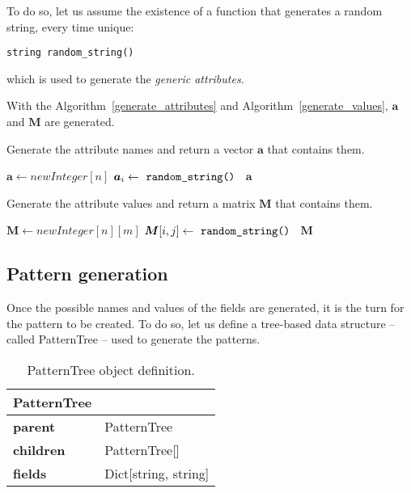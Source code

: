 \documentclass{acm_proc_article-sp-sigmod09}
\begin{document}
To do so, let us assume the existence of a function that generates a random string, every time unique:
\begin{verbatim}
string random_string()
\end{verbatim}
which is used to generate the \emph{generic attributes}.

With the Algorithm~\ref{generate_attributes} and Algorithm~\ref{generate_values}, $\boldsymbol{a}$ and $\boldsymbol{M}$ are generated.
\begin{algorithm}
\caption{Generate the attribute names and return a vector $\boldsymbol{a}$ that contains them.}
\label{generate_attributes}
\begin{algorithmic}[1]
\State $\boldsymbol{a} \gets new Integer[n]$
	\State $\boldsymbol{a}_i \gets \text{ \texttt{random\_string() }} $ 
\EndFor
\Return $\boldsymbol{a}$
\EndFunction
\end{algorithmic}
\end{algorithm}

\begin{algorithm}
\caption{Generate the attribute values and return a matrix $\boldsymbol{M}$ that contains them.}
\label{generate_values}
\begin{algorithmic}[1]
\State $\boldsymbol{M} \gets new Integer[n][m]$
		\State $\boldsymbol{M}[i, j] \gets \text{ \texttt{random\_string() }} $ 
	\EndFor
\EndFor
\Return $\boldsymbol{M}$
\EndFunction
\end{algorithmic}
\end{algorithm}

\subsection{Pattern generation}
Once the possible names and values of the fields are generated, it is the turn for the pattern to be created. To do so, let us define a tree-based data structure -- called PatternTree -- used to generate the patterns.

\begin{table}[H]
\centering
\begin{tabular}{|ll|} \hline
\textbf{PatternTree} & \\ \hline
\textbf{parent} & PatternTree \\ \hline
\textbf{children} & PatternTree[] \\ \hline
\textbf{fields} & Dict[string, string] \\
\hline\end{tabular}
\caption{PatternTree object definition.}
\label{tab:patterntree}
\end{table}
\end{document}
